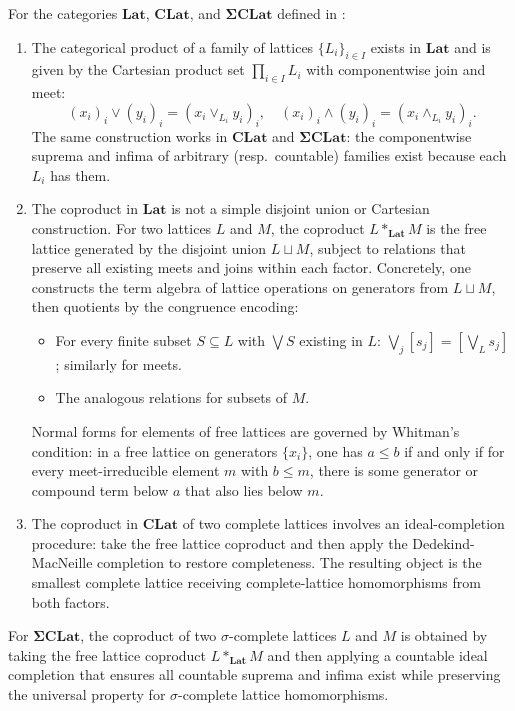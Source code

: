 \begin{proposition} \label{proposition:products_and_coproducts_in_lattice_categories}
For the categories $\mathbf{Lat}$, $\mathbf{CLat}$, and $\mathbf{\Sigma CLat}$ defined in :

\begin{enumerate}
    \item [\textbf{(Products)}] The categorical product of a family of lattices $\{L_i\}_{i \in I}$ exists in $\mathbf{Lat}$ and is given by the Cartesian product set $\prod_{i \in I} L_i$ with componentwise join and meet:
    $$(x_i)_i \vee (y_i)_i = (x_i \vee_{L_i} y_i)_i, \quad (x_i)_i \wedge (y_i)_i = (x_i \wedge_{L_i} y_i)_i.$$
    The same construction works in $\mathbf{CLat}$ and $\mathbf{\Sigma CLat}$: the componentwise suprema and infima of arbitrary (resp.\ countable) families exist because each $L_i$ has them.

    \item [\textbf{(Coproducts)}] The coproduct in $\mathbf{Lat}$ is not a simple disjoint union or Cartesian construction. For two lattices $L$ and $M$, the coproduct $L *_{\mathbf{Lat}} M$ is the free lattice generated by the disjoint union $L \sqcup M$, subject to relations that preserve all existing meets and joins within each factor. Concretely, one constructs the term algebra of lattice operations on generators from $L \sqcup M$, then quotients by the congruence encoding:
    \begin{itemize}
        \item For every finite subset $S \subseteq L$ with $\bigvee S$ existing in $L$: $\bigvee_{j} [s_j] = [\bigvee_L s_j]$; similarly for meets.
        \item The analogous relations for subsets of $M$.
    \end{itemize}
    Normal forms for elements of free lattices are governed by Whitman's condition: in a free lattice on generators $\{x_i\}$, one has $a \leq b$ if and only if for every meet-irreducible element $m$ with $b \leq m$, there is some generator or compound term below $a$ that also lies below $m$.

    \item [\textbf{(CLat coproducts)}] The coproduct in $\mathbf{CLat}$ of two complete lattices involves an ideal-completion procedure: take the free lattice coproduct and then apply the Dedekind-MacNeille completion to restore completeness. The resulting object is the smallest complete lattice receiving complete-lattice homomorphisms from both factors.
\end{enumerate}

For $\mathbf{\Sigma CLat}$, the coproduct of two $\sigma$-complete lattices $L$ and $M$ is obtained by taking the free lattice coproduct $L *_{\mathbf{Lat}} M$ and then applying a countable ideal completion that ensures all countable suprema and infima exist while preserving the universal property for $\sigma$-complete lattice homomorphisms.
\end{proposition}
